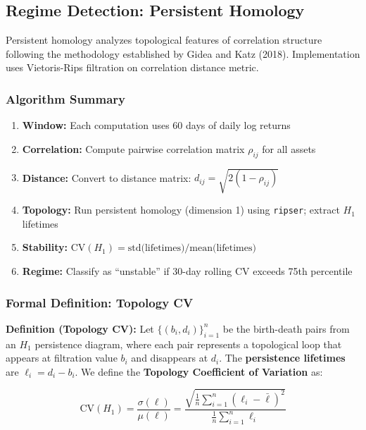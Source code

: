 \subsection{Regime Detection: Persistent Homology}

Persistent homology analyzes topological features of correlation structure following the methodology established by Gidea and Katz (2018). Implementation uses Vietoris-Rips filtration on correlation distance metric.

\subsubsection{Algorithm Summary}

\begin{enumerate}
\item \textbf{Window:} Each computation uses 60 days of daily log returns
\item \textbf{Correlation:} Compute pairwise correlation matrix $\rho_{ij}$ for all assets
\item \textbf{Distance:} Convert to distance matrix: $d_{ij} = \sqrt{2(1 - \rho_{ij})}$
\item \textbf{Topology:} Run persistent homology (dimension 1) using \texttt{ripser}; extract $H_1$ lifetimes
\item \textbf{Stability:} $\text{CV}(H_1) = \text{std(lifetimes)} / \text{mean(lifetimes)}$
\item \textbf{Regime:} Classify as ``unstable'' if 30-day rolling CV exceeds 75th percentile
\end{enumerate}

\subsubsection{Formal Definition: Topology CV}

\textbf{Definition (Topology CV):} Let $\{(b_i, d_i)\}_{i=1}^{n}$ be the birth-death pairs from an $H_1$ persistence diagram, where each pair represents a topological loop that appears at filtration value $b_i$ and disappears at $d_i$. The \textbf{persistence lifetimes} are $\ell_i = d_i - b_i$. We define the \textbf{Topology Coefficient of Variation} as:

\begin{equation}
\text{CV}(H_1) = \frac{\sigma(\ell)}{\mu(\ell)} = \frac{\sqrt{\frac{1}{n}\sum_{i=1}^n (\ell_i - \bar{\ell})^2}}{\frac{1}{n}\sum_{i=1}^n \ell_i}
\label{eq:topology-cv}
\end{equation}


